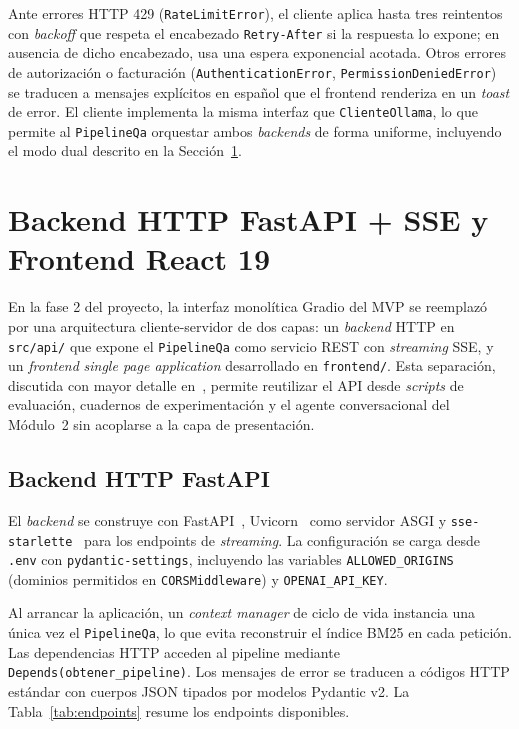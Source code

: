 \documentclass[conference]{IEEEtran}
\newcommand{\code}[1]{\texttt{\small #1}}
\begin{document}
Ante errores HTTP 429 (\code{RateLimitError}), el cliente aplica hasta tres
reintentos con \textit{backoff} que respeta el encabezado \code{Retry-After}
si la respuesta lo expone; en ausencia de dicho encabezado, usa una espera
exponencial acotada. Otros errores de autorización o facturación
(\code{AuthenticationError}, \code{PermissionDeniedError}) se traducen a
mensajes explícitos en español que el frontend renderiza en un
\textit{toast} de error. El cliente implementa la misma interfaz que
\code{ClienteOllama}, lo que permite al \code{PipelineQa} orquestar ambos
\textit{backends} de forma uniforme, incluyendo el modo dual descrito en
la Sección~\ref{sec:api_ui}.

\section{Backend HTTP FastAPI + SSE y Frontend React 19}
\label{sec:api_ui}

En la fase 2 del proyecto, la interfaz monolítica Gradio del MVP se
reemplazó por una arquitectura cliente-servidor de dos capas: un
\textit{backend} HTTP en \code{src/api/} que expone el \code{PipelineQa}
como servicio REST con \textit{streaming} SSE, y un \textit{frontend}
\textit{single page application} desarrollado en \code{frontend/}. Esta
separación, discutida con mayor detalle en~\cite{decision_fvl_fase2}, permite
reutilizar el API desde \textit{scripts} de evaluación, cuadernos de
experimentación y el agente conversacional del Módulo~2 sin acoplarse a la
capa de presentación.

\subsection{Backend HTTP FastAPI}

El \textit{backend} se construye con FastAPI~\cite{fastapi},
Uvicorn~\cite{uvicorn} como servidor ASGI y
\code{sse-starlette}~\cite{ssestarlette} para los endpoints de
\textit{streaming}. La configuración se carga desde \code{.env} con
\code{pydantic-settings}, incluyendo las variables \code{ALLOWED\_ORIGINS}
(dominios permitidos en \code{CORSMiddleware}) y \code{OPENAI\_API\_KEY}.

Al arrancar la aplicación, un \textit{context manager} de ciclo de vida
instancia una única vez el \code{PipelineQa}, lo que evita reconstruir el
índice BM25 en cada petición. Las dependencias HTTP acceden al pipeline
mediante \code{Depends(obtener\_pipeline)}. Los mensajes de error se
traducen a códigos HTTP estándar con cuerpos JSON tipados por modelos
Pydantic v2. La Tabla~\ref{tab:endpoints} resume los endpoints disponibles.
\end{document}
